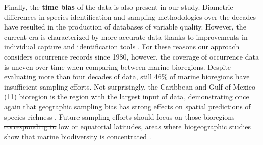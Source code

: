 \documentclass[12pt,authoryear]{elsarticle}
\providecommand{\DIFaddtex}[1]{{\protect\color{blue}\uwave{#1}}} %
\providecommand{\DIFdeltex}[1]{{\protect\color{red}\sout{#1}}}                      %
\providecommand{\DIFaddbegin}{} %
\providecommand{\DIFaddend}{} %
\providecommand{\DIFdelbegin}{} %
\providecommand{\DIFdelend}{} %
\providecommand{\DIFadd}[1]{\texorpdfstring{\DIFaddtex{#1}}{#1}} %
\providecommand{\DIFdel}[1]{\texorpdfstring{\DIFdeltex{#1}}{}} %
\begin{document}
Finally, the \DIFdelbegin \textbf{\DIFdel{time bias}} %
\DIFdelend \DIFaddbegin \DIFadd{time bias }\DIFaddend of the data is also present in our study. Diametric differences in species identification and sampling methodologies over the decades have resulted in the production of databases of variable quality. However, the current era is characterized by more accurate data thanks to improvements in individual capture and identification tools \citep{costello2015conser,jin2020bdcleaner}. For these reasons our approach considers occurrence records since 1980, however, the coverage of occurrence data is uneven over time when comparing between marine bioregions. Despite evaluating more than four decades of data, still 46\% of marine bioregions have insufficient sampling efforts. Not surprisingly, the Caribbean and Gulf of Mexico (11) bioregion is the region with the largest input of data, demonstrating once again that geographic sampling bias has strong effects on spatial predictions of species richness \citep{yang2013geographical}. Future sampling efforts should focus on \DIFdelbegin \DIFdel{those bioregions corresponding to }\DIFdelend \DIFaddbegin \DIFadd{bioregions at }\DIFaddend low or equatorial latitudes, areas where biogeographic studies show that marine biodiversity is concentrated \citep{costello2017marine}.
\end{document}
